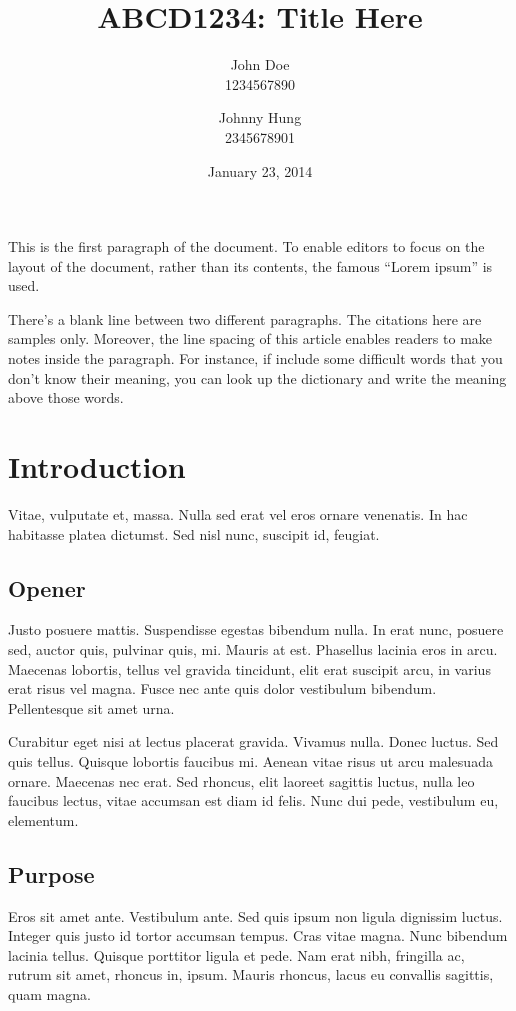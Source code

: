 \documentclass[12pt,a4paper]{article}
\title{ABCD1234: Title Here}
\author{
  John Doe\\  %
  1234567890  %
  \and
  Johnny Hung\\
  2345678901
}
\date{January 23, 2014}
\begin{document}
\maketitle

This is the first paragraph of the document.  To enable editors to focus on the layout of the document, rather than its contents, the famous ``Lorem ipsum'' is used.

There's a blank line between two different paragraphs.  The citations here are samples only.  \parencite{Gnu13}  Moreover, the line spacing of this article enables readers to make notes inside the paragraph.  For instance, if \textcite{kaplan2010users} include some difficult words that you don't know their meaning, you can look up the dictionary and write the meaning above those words.

\section{Introduction}

Vitae, vulputate et, massa. Nulla sed erat vel eros ornare venenatis.  In hac habitasse platea dictumst. Sed nisl nunc, suscipit id, feugiat.

\subsection{Opener}

Justo posuere mattis. Suspendisse egestas bibendum nulla. In erat nunc,
posuere sed, auctor quis, pulvinar quis, mi. Mauris at est. Phasellus
lacinia eros in arcu. Maecenas lobortis, tellus vel gravida tincidunt, elit
erat suscipit arcu, in varius erat risus vel magna. Fusce nec ante quis
dolor vestibulum bibendum. Pellentesque sit amet urna.

Curabitur eget nisi at lectus placerat gravida. Vivamus nulla. Donec
luctus. Sed quis tellus. Quisque lobortis faucibus mi. Aenean vitae risus ut
arcu malesuada ornare. Maecenas nec erat. Sed rhoncus, elit laoreet
sagittis luctus, nulla leo faucibus lectus, vitae accumsan est diam id
felis. Nunc dui pede, vestibulum eu, elementum.

\subsection{Purpose}

Eros sit amet ante. Vestibulum ante. Sed quis ipsum non ligula dignissim
luctus. Integer quis justo id tortor accumsan tempus. Cras vitae magna.
Nunc bibendum lacinia tellus. Quisque porttitor ligula et pede. Nam erat
nibh, fringilla ac, rutrum sit amet, rhoncus in, ipsum. Mauris rhoncus,
lacus eu convallis sagittis, quam magna.
\end{document}
